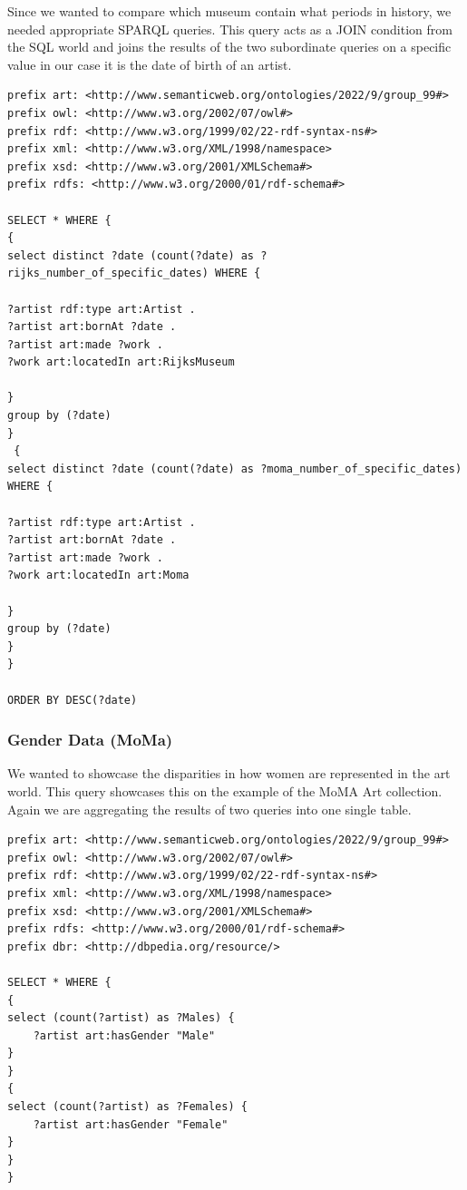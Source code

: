\documentclass{article}
\begin{document}
Since we wanted to compare which museum contain what periods in history, we needed appropriate SPARQL queries. This query acts as a JOIN condition from the SQL world and joins the results of the  two subordinate queries on a specific value in our case it is the date of birth of an artist. 

\begin{verbatim}
prefix art: <http://www.semanticweb.org/ontologies/2022/9/group_99#> 
prefix owl: <http://www.w3.org/2002/07/owl#> 
prefix rdf: <http://www.w3.org/1999/02/22-rdf-syntax-ns#> 
prefix xml: <http://www.w3.org/XML/1998/namespace> 
prefix xsd: <http://www.w3.org/2001/XMLSchema#> 
prefix rdfs: <http://www.w3.org/2000/01/rdf-schema#> 

SELECT * WHERE { 
{
select distinct ?date (count(?date) as ?rijks_number_of_specific_dates) WHERE { 

?artist rdf:type art:Artist .
?artist art:bornAt ?date .
?artist art:made ?work .
?work art:locatedIn art:RijksMuseum

}
group by (?date)
}
 {
select distinct ?date (count(?date) as ?moma_number_of_specific_dates) WHERE { 

?artist rdf:type art:Artist .
?artist art:bornAt ?date .
?artist art:made ?work .
?work art:locatedIn art:Moma

}
group by (?date)
}
}

ORDER BY DESC(?date)

\end{verbatim}

\subsubsection{Gender Data (MoMa)}


We wanted to showcase the disparities in how women are represented in the art world. This query showcases this on the example of the MoMA Art collection. Again we are aggregating the results of two queries into one single table. 

\begin{verbatim}
prefix art: <http://www.semanticweb.org/ontologies/2022/9/group_99#>
prefix owl: <http://www.w3.org/2002/07/owl#>
prefix rdf: <http://www.w3.org/1999/02/22-rdf-syntax-ns#>
prefix xml: <http://www.w3.org/XML/1998/namespace>
prefix xsd: <http://www.w3.org/2001/XMLSchema#>
prefix rdfs: <http://www.w3.org/2000/01/rdf-schema#>
prefix dbr: <http://dbpedia.org/resource/>

SELECT * WHERE {
{
select (count(?artist) as ?Males) {
    ?artist art:hasGender "Male"
}
}
{
select (count(?artist) as ?Females) {
    ?artist art:hasGender "Female"
}
}
}
\end{verbatim}
\end{document}
